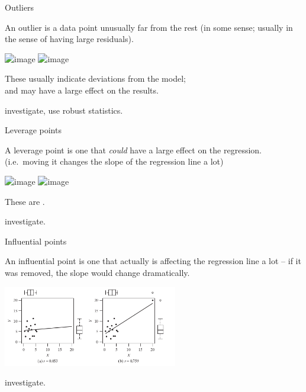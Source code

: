 \begin{frame}{Outliers}

    An \alert{outlier} is a data point unusually far from the rest (in some sense; usually in the sense of having \alert{large residuals}).
    \begin{center}
        \includegraphics<1>[width=3in]{fig-12-6-3.png}
        \includegraphics<2>[width=2in]{fig-12-6-3.png}
    \end{center}
    \pause

    These usually indicate deviations from the model;\\
    and may have a large effect on the results.


    \vspace{2em}

     investigate, use robust statistics.

\end{frame}


\begin{frame}{Leverage points}

    A \alert{leverage point} is one that \emph{could} have a large effect on the regression.
    (i.e.\ moving it changes the slope of the regression line a lot)
    \begin{center}
        \includegraphics<1>[width=3in]{fig-12-6-3.png}
        \includegraphics<2>[width=2in]{fig-12-6-3.png}
    \end{center}
    \pause

    \vspace{1em}

    These are .


    \vspace{1em}

     investigate.

\end{frame}



\begin{frame}{Influential points}

    An \alert{influential point} is one that actually \alert{is} affecting the regression line a lot -- if it was removed, the slope would change dramatically.
    \begin{center}
        \includegraphics[width=3in]{fig-12-6-4.png}
    \end{center}

    \vspace{2em}

     investigate.

\end{frame}


